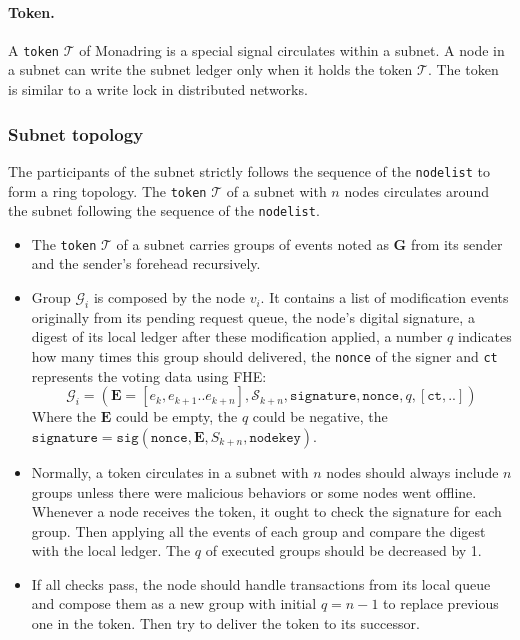 \documentclass[11pt]{article}
\begin{document}
\paragraph{Token.} A \texttt{token} $\mathcal{T}$ of Monadring is a special signal circulates within a subnet.
A node in a subnet can write the subnet ledger only when it holds the token $\mathcal{T}$. The token is similar to a write lock in distributed networks.

\subsubsection{Subnet topology}
\label{sec:subnet_topology}
The participants of the subnet strictly follows the sequence of the \texttt{nodelist} to form a ring topology.
The \texttt{token} $\mathcal{T}$ of a subnet with $n$ nodes circulates around the subnet following the sequence of the \texttt{nodelist}.

\begin{itemize}
\item The \texttt{token} $\mathcal{T}$ of a subnet carries groups of events noted as $\mathbf{G}$ from its sender and the sender{'}s forehead recursively.
\item Group $\mathcal{G}_{i}$ is composed by the node $v_{i}$. It contains a list of modification events originally from its pending request queue, the node{'}s digital signature, a digest of its local ledger after these modification applied, a number $q$ indicates how many times this group should delivered, the \texttt{nonce} of the signer and \texttt{ct} represents the voting data using FHE:
\begin{equation}
\mathcal{G}_{i} = (\mathbf{E} = [e_{k}, e_{k+1}..e_{k+n}], \mathcal{S}_{k+n}, \texttt{signature}, \texttt{nonce}, q, [\texttt{ct},..])
\end{equation}
Where the $\mathbf{E}$ could be empty, the $q$ could be negative, the \(\texttt{signature} = \texttt{sig}(\texttt{nonce}, \mathbf{E}, S_{k+n}, \texttt{nodekey})\).

\item Normally, a token circulates in a subnet with $n$ nodes should always include $n$ groups unless there were malicious behaviors or some nodes went offline.
Whenever a node receives the token, it ought to check the signature for each group.
Then applying all the events of each group and compare the digest with the local ledger.
The $q$ of executed groups should be decreased by 1.

\item If all checks pass, the node should handle transactions from its local queue and compose them as a new group with initial $q=n-1$ to replace previous one in the token.
Then try to deliver the token to its successor.
\end{itemize}
\end{document}
